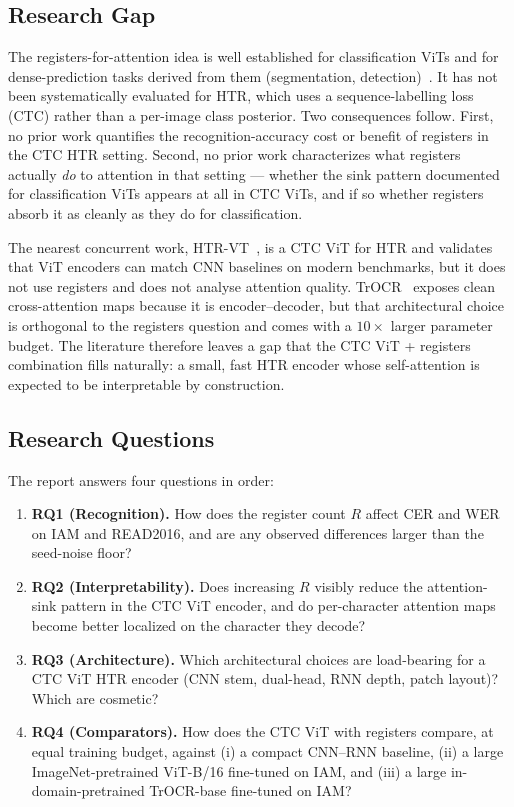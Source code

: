 \subsection{Research Gap}
\label{sec:research_gap}

The registers-for-attention idea is well established for classification ViTs and for dense-prediction tasks derived from them (segmentation, detection)~\cite{darcet2024registers}. It has not been systematically evaluated for HTR, which uses a sequence-labelling loss (CTC) rather than a per-image class posterior. Two consequences follow. First, no prior work quantifies the recognition-accuracy cost or benefit of registers in the CTC HTR setting. Second, no prior work characterizes what registers actually \emph{do} to attention in that setting --- whether the sink pattern documented for classification ViTs appears at all in CTC ViTs, and if so whether registers absorb it as cleanly as they do for classification.

The nearest concurrent work, HTR-VT~\cite{li2024htrvt}, is a CTC ViT for HTR and validates that ViT encoders can match CNN baselines on modern benchmarks, but it does not use registers and does not analyse attention quality. TrOCR~\cite{li2023trocr} exposes clean cross-attention maps because it is encoder--decoder, but that architectural choice is orthogonal to the registers question and comes with a $10\times$ larger parameter budget. The literature therefore leaves a gap that the CTC ViT + registers combination fills naturally: a small, fast HTR encoder whose self-attention is expected to be interpretable by construction.

\subsection{Research Questions}
\label{sec:research_questions}

The report answers four questions in order:

\begin{enumerate}
    \item \textbf{RQ1 (Recognition).} How does the register count $R$ affect CER and WER on IAM and READ2016, and are any observed differences larger than the seed-noise floor?
    \item \textbf{RQ2 (Interpretability).} Does increasing $R$ visibly reduce the attention-sink pattern in the CTC ViT encoder, and do per-character attention maps become better localized on the character they decode?
    \item \textbf{RQ3 (Architecture).} Which architectural choices are load-bearing for a CTC ViT HTR encoder (CNN stem, dual-head, RNN depth, patch layout)? Which are cosmetic?
    \item \textbf{RQ4 (Comparators).} How does the CTC ViT with registers compare, at equal training budget, against (i) a compact CNN--RNN baseline, (ii) a large ImageNet-pretrained ViT-B/16 fine-tuned on IAM, and (iii) a large in-domain-pretrained TrOCR-base fine-tuned on IAM?
\end{enumerate}

